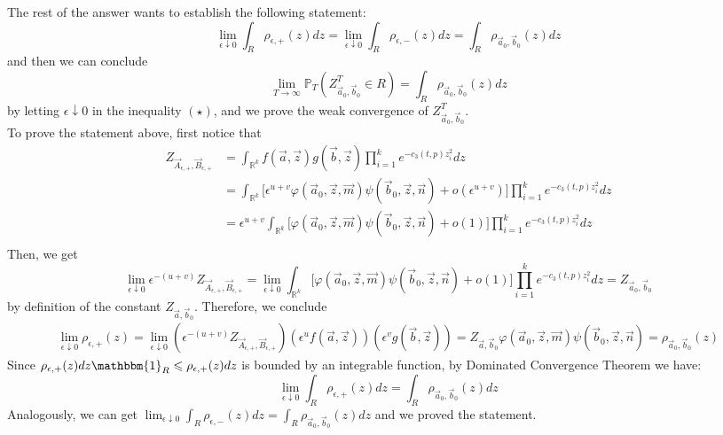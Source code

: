 \documentclass[12pt]{article}
\begin{document}
The rest of the answer wants to establish the following statement:
$$\lim_{\epsilon\downarrow 0}\int_{R}\rho_{\epsilon,+}(z)dz=\lim_{\epsilon\downarrow 0}\int_{R}\rho_{\epsilon,-}(z)dz=\int_{R}\rho_{\vec{a}_{0},\vec{b}_{0}}(z)dz$$ and then we can conclude $$\lim_{T\rightarrow\infty}\mathbb{P}_{T}(Z^{T}_{\vec{a}_{0},\vec{b}_{0}}\in R)=\int_{R}\rho_{\vec{a}_{0},\vec{b}_{0}}(z)dz$$ by letting $\epsilon\downarrow 0$ in the inequality $(\star)$, and we prove the weak convergence of $Z^{T}_{\vec{a}_{0},\vec{b}_{0}}$.\\
To prove the statement above, first notice that
\begin{align*}
	Z_{\vec{A}_{\epsilon,+},\vec{B}_{\epsilon,+}}&=\int_{\mathbb{R}^{k}}f(\vec{a},\vec{z})g(\vec{b},\vec{z})\prod_{i=1}^{k}e^{-c_{3}(t,p)z^{2}_{i}}dz\\
	&=\int_{\mathbb{R}^{k}}\big[\epsilon^{u+v}\varphi(\vec{a}_{0},\vec{z},\vec{m})\psi(\vec{b}_{0},\vec{z},\vec{n})+o(\epsilon^{u+v})\big]\prod_{i=1}^{k}e^{-c_{3}(t,p)z^{2}_{i}}dz\\
	&=\epsilon^{u+v}\int_{\mathbb{R}^{k}}\big[\varphi(\vec{a}_{0},\vec{z},\vec{m})\psi(\vec{b}_{0},\vec{z},\vec{n})+o(1)\big]\prod_{i=1}^{k}e^{-c_{3}(t,p)z^{2}_{i}}dz\\
\end{align*}
Then, we get
$$\lim_{\epsilon\downarrow 0} \epsilon^{-(u+v)} Z_{\vec{A}_{\epsilon,+},\vec{B}_{\epsilon,+}}=\lim_{\epsilon\downarrow 0}\int_{\mathbb{R}^{k}}\big[\varphi(\vec{a}_{0},\vec{z},\vec{m})\psi(\vec{b}_{0},\vec{z},\vec{n})+o(1)\big]\prod_{i=1}^{k}e^{-c_{3}(t,p)z^{2}_{i}}dz=Z_{\vec{a}_{0},\vec{b}_{0}}$$
by definition of the constant $Z_{\vec{a},\vec{b}_{0}}$.
Therefore, we conclude
\begin{align*}
	\lim_{\epsilon\downarrow 0}\rho_{\epsilon,+}(z)=\lim_{\epsilon\downarrow 0}(\epsilon^{-(u+v)}Z_{\vec{A}_{\epsilon,+},\vec{B}_{\epsilon,+}})(\epsilon^{u}f(\vec{a},\vec{z}))(\epsilon^{v}g(\vec{b},\vec{z}))=Z_{\vec{a},\vec{b}_{0}}\varphi(\vec{a}_{0},\vec{z},\vec{m})\psi(\vec{b}_{0},\vec{z},\vec{n})=\rho_{\vec{a}_{0},\vec{b}_{0}}(z)
\end{align*}
Since $\rho_{\epsilon,+}(z)dz\mathbbm{1}_{R}\leqslant\rho_{\epsilon,+}(z)dz$ is bounded by an integrable function, by Dominated Convergence Theorem we have: $$\lim_{\epsilon\downarrow 0}\int_{R}\rho_{\epsilon,+}(z)dz=\int_{R}\rho_{\vec{a}_{0},\vec{b}_{0}}(z)dz$$ Analogously, we can get $\lim_{\epsilon\downarrow 0}\int_{R}\rho_{\epsilon,-}(z)dz=\int_{R}\rho_{\vec{a}_{0},\vec{b}_{0}}(z)dz$ and we proved the statement.
\end{document}
